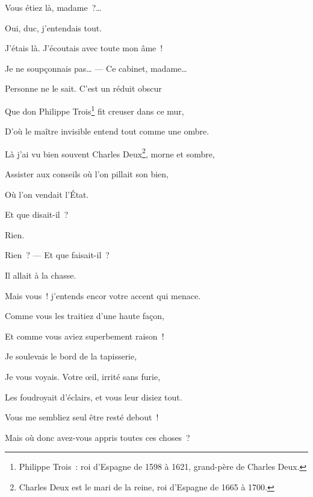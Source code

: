 {Vous étiez là, madame~?…

\vspace*{45pt}


\phantom{Vous étiez là, madame~? }Oui, duc, j'entendais tout.

J'étais là. J'écoutais avec toute mon âme~!


Je ne soupçonnais pas… --- Ce cabinet, madame…


Personne ne le sait. C'est un réduit obscur

Que don Philippe Trois\footnote{Philippe Trois~: roi d'Espagne de 1598 à 1621, grand-père de Charles Deux.} fit creuser dans ce mur,

D'où le maître invisible entend tout comme une ombre.

Là j'ai vu bien souvent Charles Deux\footnote{Charles Deux est le mari de la reine, roi d'Espagne de 1665 à 1700.}, morne et sombre,

Assister aux conseils où l'on pillait son bien,

Où l'on vendait l'État.


\phantom{Où l'on vendait l'État. }Et que disait-il~?


\phantom{Où l'on vendait l'État. Et que disait-il~? }Rien.


Rien~? --- Et que faisait-il~?


\phantom{Rien~? --- Et que faisait-il~? }Il allait à la chasse.

Mais vous~! j'entends encor votre accent qui menace.

Comme vous les traitiez d'une haute façon,

Et comme vous aviez superbement raison~!

Je soulevais le bord de la tapisserie,

Je vous voyais. Votre œil, irrité sans furie,

Les foudroyait d'éclairs, et vous leur disiez tout.

Vous me sembliez seul être resté debout~!

Mais où donc avez-vous appris toutes ces choses~?

}
